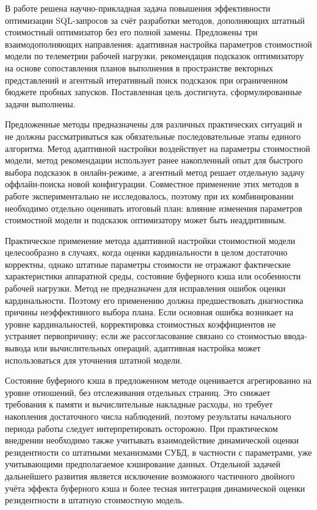
В работе решена научно-прикладная задача повышения эффективности оптимизации SQL-запросов за счёт разработки методов, дополняющих штатный стоимостный оптимизатор без его полной замены. Предложены три взаимодополняющих направления: адаптивная настройка параметров стоимостной модели по телеметрии рабочей нагрузки, рекомендация подсказок оптимизатору на основе сопоставления планов выполнения в пространстве векторных представлений и агентный итеративный поиск подсказок при ограниченном бюджете пробных запусков. Поставленная цель достигнута, сформулированные задачи выполнены.

Предложенные методы предназначены для различных практических ситуаций и не должны рассматриваться как обязательные последовательные этапы единого алгоритма. Метод адаптивной настройки воздействует на параметры стоимостной модели, метод рекомендации использует ранее накопленный опыт для быстрого выбора подсказок в онлайн-режиме, а агентный метод решает отдельную задачу оффлайн-поиска новой конфигурации. Совместное применение этих методов в работе экспериментально не исследовалось, поэтому при их комбинировании необходимо отдельно оценивать итоговый план: влияние изменения параметров стоимостной модели и подсказок оптимизатору может быть неаддитивным.

Практическое применение метода адаптивной настройки стоимостной модели целесообразно в случаях, когда оценки кардинальности в целом достаточно корректны, однако штатные параметры стоимости не отражают фактические характеристики аппаратной среды, состояние буферного кэша или особенности рабочей нагрузки. Метод не предназначен для исправления ошибок оценки кардинальности. Поэтому его применению должна предшествовать диагностика причины неэффективного выбора плана. Если основная ошибка возникает на уровне кардинальностей, корректировка стоимостных коэффициентов не устраняет первопричину; если же рассогласование связано со стоимостью ввода-вывода или вычислительных операций, адаптивная настройка может использоваться для уточнения штатной модели.

Состояние буферного кэша в предложенном методе оценивается агрегированно на уровне отношений, без отслеживания отдельных страниц. Это снижает требования к памяти и вычислительные накладные расходы, но требует накопления достаточного числа наблюдений, поэтому результаты начального периода работы следует интерпретировать осторожно. При практическом внедрении необходимо также учитывать взаимодействие динамической оценки резидентности со штатными механизмами СУБД, в частности с параметрами, уже учитывающими предполагаемое кэширование данных. Отдельной задачей дальнейшего развития является исключение возможного частичного двойного учёта эффекта буферного кэша и более тесная интеграция динамической оценки резидентности в штатную стоимостную модель.

